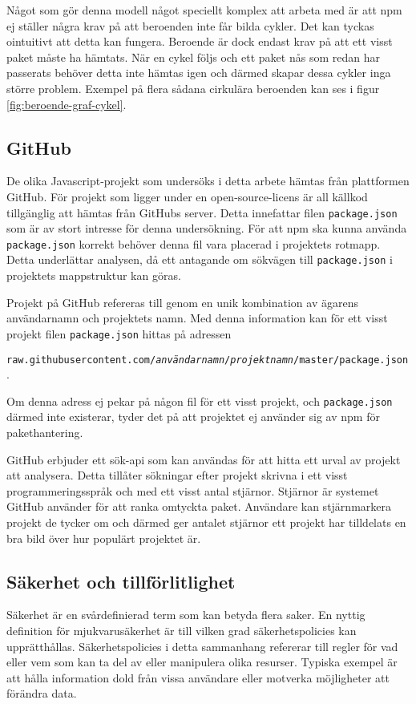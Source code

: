 Något som gör denna modell något speciellt komplex att arbeta med är att npm ej ställer några krav på att beroenden inte får bilda cykler. Det kan tyckas ointuitivt att detta kan fungera. Beroende är dock endast krav på att ett visst paket måste ha hämtats. När en cykel följs och ett paket nås som redan har passerats behöver detta inte hämtas igen och därmed skapar dessa cykler inga större problem. Exempel på flera sådana cirkulära beroenden kan ses i figur \ref{fig:beroende-graf-cykel}.

\subsection{GitHub}
De olika Javascript-projekt som undersöks i detta arbete hämtas från plattformen GitHub. För projekt som ligger under en open-source-licens är all källkod tillgänglig att hämtas från GitHubs server. Detta innefattar filen \texttt{package.json} som är av stort intresse för denna undersökning. För att npm ska kunna använda \texttt{package.json} korrekt behöver denna fil vara placerad i projektets rotmapp. Detta underlättar analysen, då ett antagande om sökvägen till \texttt{package.json} i projektets mappstruktur kan göras.

Projekt på GitHub refereras till genom en unik kombination av ägarens användarnamn och projektets namn. Med denna information kan för ett visst projekt filen \texttt{package.json} hittas på adressen

\texttt{raw.githubusercontent.com/\textit{användarnamn}/\textit{projektnamn}/master/package.json}.

Om denna adress ej pekar på någon fil för ett visst projekt, och \texttt{package.json} därmed inte existerar, tyder det på att projektet ej använder sig av npm för pakethantering.

GitHub erbjuder ett sök-api som kan användas för att hitta ett urval av projekt att analysera.\cite{github-api} Detta tillåter sökningar efter projekt skrivna i ett visst programmeringsspråk och med ett visst antal stjärnor. Stjärnor är systemet GitHub använder för att ranka omtyckta paket. Användare kan stjärnmarkera projekt de tycker om och därmed ger antalet stjärnor ett projekt har tilldelats en bra bild över hur populärt projektet är.

\subsection{Säkerhet och tillförlitlighet}
Säkerhet är en svårdefinierad term som kan betyda flera saker. En nyttig definition för mjukvarusäkerhet är till vilken grad säkerhetspolicies kan upprätthållas. Säkerhetspolicies i detta sammanhang refererar till regler för vad eller vem som kan ta del av eller manipulera olika resurser.\cite{secure-software} Typiska exempel är att hålla information dold från vissa användare eller motverka möjligheter att förändra data.

